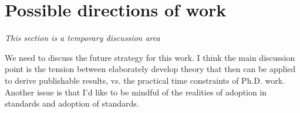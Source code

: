 \section{Possible directions of work}

\emph{This section is a temporary discussion area}

We need to discuss the future strategy for this work. I think the main
discussion point is the tension between elaborately develop theory
that then can be applied to derive publishable results, vs. the
practical time constraints of Ph.D. work. Another issue is that I'd
like to be mindful of the realities of adoption in standards and
adoption of standards.